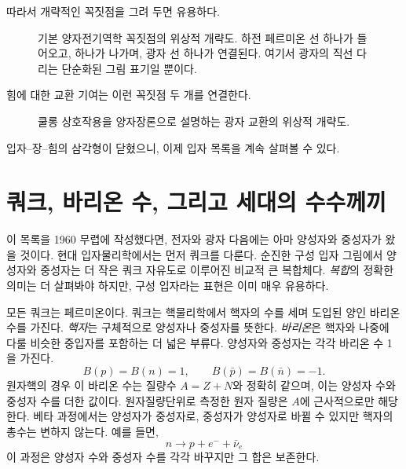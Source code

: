 따라서 개략적인 꼭짓점을 그려 두면 유용하다.

\begin{figure}[h]
\centering
{}
\caption{기본 양자전기역학 꼭짓점의 위상적 개략도. 하전 페르미온 선 하나가 들어오고, 하나가 나가며, 광자 선 하나가 연결된다. 여기서 광자의 직선 다리는 단순화된 그림 표기일 뿐이다.}
\end{figure}

힘에 대한 교환 기여는 이런 꼭짓점 두 개를 연결한다.

\begin{figure}[h]
\centering
{}
\caption{쿨롱 상호작용을 양자장론으로 설명하는 광자 교환의 위상적 개략도.}
\end{figure}

입자--장--힘의 삼각형이 닫혔으니, 이제 입자 목록을 계속 살펴볼 수 있다.

\section{쿼크, 바리온 수, 그리고 세대의 수수께끼}

이 목록을 1960 무렵에 작성했다면, 전자와 광자 다음에는 아마 양성자와 중성자가 왔을 것이다. 현대 입자물리학에서는 먼저 쿼크를 다룬다. 순진한 구성 입자 그림에서 양성자와 중성자는 더 작은 쿼크 자유도로 이루어진 비교적 큰 복합체다. \emph{복합}의 정확한 의미는 더 살펴봐야 하지만, 구성 입자라는 표현은 이미 매우 유용하다.

모든 쿼크는 페르미온이다. 쿼크는 핵물리학에서 핵자의 수를 세며 도입된 양인 바리온 수를 가진다. \emph{핵자}는 구체적으로 양성자나 중성자를 뜻한다. \emph{바리온}은 핵자와 나중에 다룰 비슷한 중입자를 포함하는 더 넓은 부류다. 양성자와 중성자는 각각 바리온 수 1을 가진다.
\begin{equation}
B(p)=B(n)=1,
\qquad
B(\bar p)=B(\bar n)=-1.
\end{equation}
원자핵의 경우 이 바리온 수는 질량수 \(A=Z+N\)와 정확히 같으며, 이는 양성자 수와 중성자 수를 더한 값이다. 원자질량단위로 측정한 원자 질량은 \(A\)에 근사적으로만 해당한다. 베타 과정에서는 양성자가 중성자로, 중성자가 양성자로 바뀔 수 있지만 핵자의 총수는 변하지 않는다. 예를 들면,
\begin{equation}
n\longrightarrow p+e^-+\bar\nu_e
\end{equation}
이 과정은 양성자 수와 중성자 수를 각각 바꾸지만 그 합은 보존한다.

